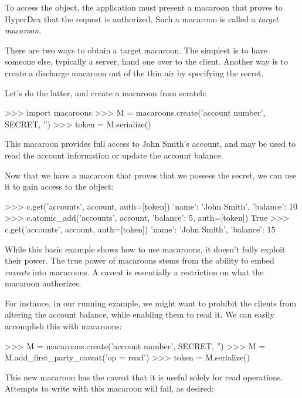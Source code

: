 To access the object, the application must present a macaroon that proves to
HyperDex that the request is authorized.  Such a macaroon is called a {\em
target macaroon}.

There are two ways to obtain a target macaroon. The simplest is to have someone
else, typically a server, hand one over to the client.  Another way is to create
a discharge macaroon out of the thin air by specifying the secret.

Let's do the latter, and create a macaroon from scratch:

\begin{pythoncode}
>>> import macaroons
>>> M = macaroons.create('account number', SECRET, '')
>>> token = M.serialize()
\end{pythoncode}

This macaroon provides full access to John Smith's account, and may be used to
read the account information or update the account balance.

Now that we have a macaroon that proves that we possess the secret, we can use
it to gain access to the object:

\begin{pythoncode}
>>> c.get('accounts', account, auth=[token])
{'name': 'John Smith', 'balance': 10}
>>> c.atomic_add('accounts', account, {'balance': 5}, auth=[token])
True
>>> c.get('accounts', account, auth=[token])
{'name': 'John Smith', 'balance': 15}
\end{pythoncode}

While this basic example shows how to use macaroons, it doesn't fully exploit
their power. The true power of macaroons stems from the ability to embed {\em
caveats} into macaroons. A caveat is essentially a restriction on what the
macaroon authorizes.

For instance, in our running example, we might want to prohibit the clients from
altering the account balance, while enabling them to read it. We can easily
accomplish this with macaroons:

\begin{pythoncode}
>>> M = macaroons.create('account number', SECRET, '')
>>> M = M.add_first_party_caveat('op = read')
>>> token = M.serialize()
\end{pythoncode}

This new macaroon has the caveat that it is useful solely for read operations.
Attempts to write with this macaroon will fail, as desired:

